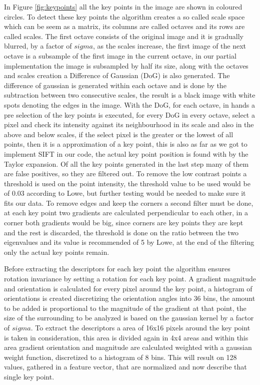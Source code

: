 \documentclass[12pt,a4paper]{article}
\begin{document}
	In Figure \ref{fig:keypoints} all the key points in the image are shown in coloured circles. To detect these key points the algorithm creates a so called scale space which can be seem as a matrix, its columns are called octaves and its rows are called scales. The first octave consists of the original image and it is gradually blurred, by a factor of $sigma$, as the scales increase, the first image of the next octave is a subsample of the first image in the current octave, in our partial implementation the image is subsampled by half its size, along with the octaves and scales creation a Difference of Gaussian (DoG) is also generated. The difference of gaussian is generated within each octave and is done by the subtraction between two consecutive scales, the result is a black image with white spots denoting the edges in the image. With the DoG, for each octave, in hands a pre selection of the key points is executed, for every DoG in every octave, select a pixel and check its intensity against its neighbourhood in its scale and also in the above and below scales, if the select pixel is the greater or the lowest of all points, then it is a approximation of a key point, this is also as far as we got to implement SIFT in our code, the actual key point position is found with by the Taylor expansion. Of all the key points generated in the last step many of them are false positives, so they are filtered out. To remove the low contrast points a threshold is used on the point intensity, the threshold value to be used would be of 0.03 according to Lowe, but further testing would be needed to make sure it fits our data. To remove edges and keep the corners a second filter must be done, at each key point two gradients are calculated perpendicular to each other, in a corner both gradients would be big, since corners are key points they are kept and the rest is discarded, the threshold is done on the ratio between the two eigenvalues and its value is recommended of 5 by Lowe, at the end of the filtering only the actual key points remain.
\par
	Before extracting the descriptors for each key point the algorithm ensures rotation invariance by setting a rotation for each key point. A gradient magnitude and orientation is calculated for every pixel around the key point, a histogram of orientations is created discretizing the orientation angles into 36 bins, the amount to be added is proportional to the magnitude of the gradient at that point, the size of the surrounding to be analyzed is based on the gaussian kernel by a factor of $sigma$. To extract the descriptors a area of 16x16 pixels around the key point is taken in consideration, this area is divided again in 4x4 areas and within this area gradient orientation and magnitude are calculated weighted with a gaussian weight function, discretized to a histogram of 8 bins. This will result on 128 values, gathered in a feature vector, that are normalized and now describe that single key point.
\end{document}
